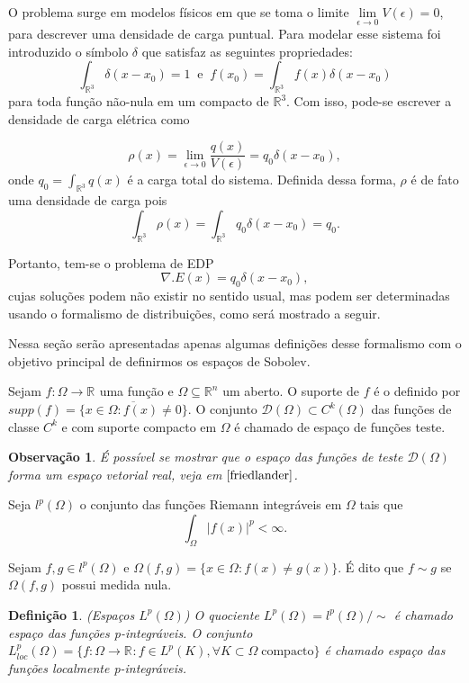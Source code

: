 \documentclass[12pt]{book}
\newtheorem{definicao}[teorema]{Definição}
\newtheorem{observacao}[teorema]{Observação}
\newcommand{\espacoLp}[1]{L^{p}(#1)}
\newcommand{\espacoLpcomp}[1]{L^{p}_{loc}(#1)}
\newcommand{\espacoLpGeral}[2]{L^{#1}(#2)}
\newcommand{\funcoesdiferenciaveis}[2]{C^{#1}(#2)}
\newcommand{\funcoesteste}{\funcoestestegeral{\Omega}}
\newcommand{\funcoestestegeral}[1]{\mathcal{D}(#1)}
\newcommand{\real}[1]{\mathbb{R}^{#1}}
\newcommand{\reta}{\real{}}
\begin{document}
	O problema surge em modelos físicos em que se toma o limite $\lim\limits_{\epsilon\to 0}V(\epsilon)=0$, para descrever uma densidade de carga puntual. Para modelar esse sistema foi introduzido o símbolo $\delta$ que satisfaz as seguintes propriedades:
	$$
	\int_{\real{3}}\delta(x-x_{0}) = 1\;\;\text{e}\;\; 	f(x_{0})=\int_{\real{3}}f(x)\delta(x-x_{0})
	$$
	para toda função não-nula em um compacto de $\real{3}$. Com isso, pode-se escrever a densidade de carga elétrica como
	
	$$
	\rho(x) = \lim_{\epsilon\to 0} \frac{q(x)}{V(\epsilon)} = q_{0}\delta(x - x_{0}),
	$$
	onde $q_{0} =\int_{\real{3}}q(x)$ é a carga total do sistema. Definida dessa forma, $\rho$ é de fato uma densidade de carga pois
	$$
	\int_{\real{3}}\rho(x) = \int_{\real{3}}q_{0}\delta(x-x_{0}) = q_{0}.
	$$
	
	Portanto, tem-se o problema de EDP
	$$
	\nabla.E(x) = q_{0}\delta(x-x_{0}),
	$$
	cujas soluções podem não existir no sentido usual, mas podem ser determinadas usando o formalismo de distribuições, como será mostrado a seguir.
	

	Nessa seção serão apresentadas apenas algumas definições desse formalismo com o objetivo principal de definirmos os espaços de Sobolev.
	
	Sejam $f:\Omega\to \reta$ uma função e $\Omega \subseteq \real{n}$ um aberto. O suporte de $f$ é o definido por $supp(f) = \overline{\{ x\in \Omega: f(x)\neq 0 \}}$. O conjunto $\funcoesteste \subset \funcoesdiferenciaveis{k}{\Omega}$ das funções de classe $C^{k}$ e com suporte compacto em $\Omega$ é chamado de espaço de funções teste.
	
	\begin{observacao}
		É possível se mostrar que o espaço das funções de teste $\funcoesteste$ forma um espaço vetorial real, veja em $\cite{friedlander}$.
	\end{observacao}
	
	Seja $l^{p}(\Omega)$ o conjunto das funções Riemann integráveis em $\Omega$ tais que 
	$$
	\int_{\Omega}|f(x)|^{p} <\infty.$$ 
	
	Sejam $f,g \in l^{p}(\Omega)$ e $\Omega(f,g) = \{x\in \Omega: f(x) \neq g(x)\}$. É dito que $f \sim g$ se $\Omega(f,g)$ possui medida nula.
	
	\begin{definicao}\label{definicao_espaco_Lp}
		(Espaços $\espacoLpGeral{p}{\Omega}$) O quociente $\espacoLpGeral{p}{\Omega}=l^{p}(\Omega)/\sim$ é chamado espaço das funções p-integráveis. O conjunto $\espacoLpcomp{\Omega} = \{f:\Omega\to \reta: f \in \espacoLp{K}, \forall K \subset \Omega \;\text{compacto}\}$ é chamado espaço das funções localmente p-integráveis.
	\end{definicao}
	
\end{document}

